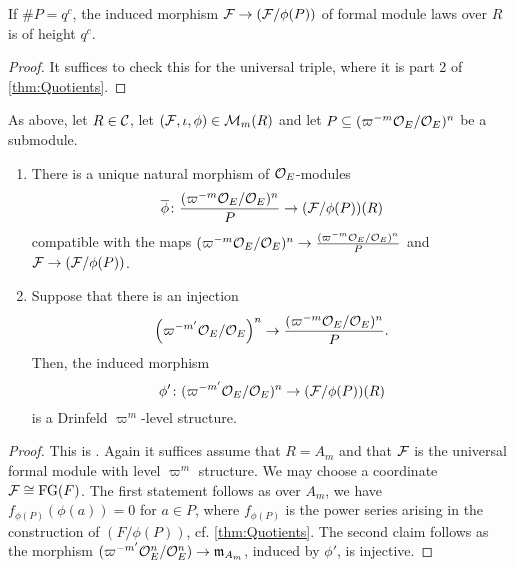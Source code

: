 \documentclass[../main.tex]{subfiles}
\begin{document}
\begin{lem}\label{lem:PropertyOfQuotient}
  If $\# P = q^c$, the induced morphism $\mathcal{F} \to (\mathcal{F}/\phi(P))$ of formal
  module laws over $R$ is of height $q^c$.
\begin{proof}
  It suffices to check this for the universal triple, where it is part 2 of 
  \cref{thm:Quotients}.
\end{proof}
\end{lem}

\begin{lem}\label{lem:DrinfeldLevelOnQuotients}
  As above, let $R \in \mathcal{C}$, let $(\mathcal{F}, \iota, \phi) \in \mathcal{M}_m(R)$ and let 
  $P \subseteq (\varpi^{-m}\mathcal{O}_E/\mathcal{O}_E)^n$ be a submodule.   
  \begin{enumerate}
    \item There is a unique natural morphism of $\mathcal{O}_E$-modules
      \begin{equation*}
        \overline \phi \colon \frac{(\varpi^{-m} \mathcal{O}_E/\mathcal{O}_E)^n}{P} \to (\mathcal{F}/\phi(P))(R)
      \end{equation*}
      compatible with the maps $(\varpi^{-m}\mathcal{O}_E/\mathcal{O}_E)^n \to
      \frac{(\varpi^{-m} \mathcal{O}_E/\mathcal{O}_E)^n}{P}$ and $\mathcal{F} \to (\mathcal{F}/\phi(P))$. 
    \item Suppose that  there is an injection 
  \begin{equation*}
    \left(\varpi^{-m'} \mathcal{O}_E/\mathcal{O}_E \right)^n \to \frac{(\varpi^{-m}
    \mathcal{O}_E/\mathcal{O}_E)^n}{P}.
  \end{equation*}
  Then, the induced morphism 
  \begin{equation*}
  \phi'\colon ({\varpi^{-m'} \mathcal{O}_E}/{\mathcal{O}_E})^n  \to 
  (\mathcal{F}/\phi(P))(R)
  \end{equation*}
  is a Drinfeld $\varpi^m$-level structure.
  \end{enumerate}
\end{lem}
\begin{proof}
  This is \cite[Proposition 4.4]{drinfel1974elliptic}. Again it suffices assume 
  that $R = A_m$ and that $\mathcal{F}$ is the universal formal module with level
  $\varpi^m$ structure. We may choose a coordinate $\mathcal{F} \cong \textnormal{FG}(F)$. The first
  statement follows as over $A_m$, we have $f_{\phi(P)}(\phi(a)) = 0$ for $a
  \in P$, where $f_{\phi(P)}$ is the power series arising in the construction of 
  $(F/\phi(P))$, cf. \cref{thm:Quotients}. The second claim follows as the 
  morphism $(\varpi^{-m'} \mathcal{O}_E^n/\mathcal{O}_E^n) \to \mathfrak{m}_{A_m}$, induced by 
  $\phi'$, is injective.
\end{proof}
\end{document}

